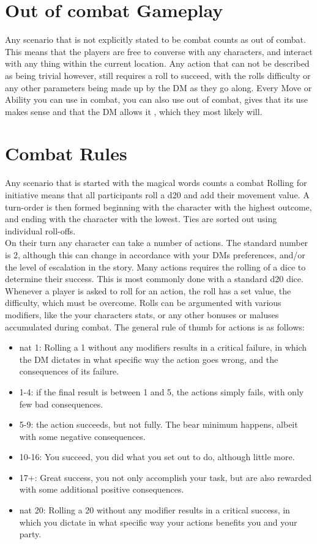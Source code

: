 \documentclass[a4paper,12pt]{article}
\begin{document}
\section{Out of combat Gameplay} 
Any scenario that is not explicitly stated to be combat counts as out of combat. This means that the players are free to converse with any characters, and interact with any thing within the current location. Any action that can not be described as being trivial however, still requires a roll to succeed, with the rolls difficulty or any other parameters being made up by the DM as they go along. Every Move or Ability you can use in combat, you can also use out of combat, gives that its use makes sense and that the DM allows it , which they most likely will.

\section{Combat Rules}
Any scenario that is started with the magical words  counts a combat Rolling for initiative means that all participants roll a d20 and add their movement value. A turn-order is then formed beginning with the character with the highest outcome, and ending with the character with the lowest. Ties are sorted out using individual roll-offs.\\
On their turn any character can take a number of actions. The standard number is 2, although this can change in accordance with your DMs preferences, and/or the level of escalation in the story. Many actions requires the rolling of a dice to determine their success. This is most commonly done with a standard d20 dice. Whenever a player is asked to roll for an action, the roll has a set value, the difficulty, which must be overcome. Rolls can be argumented with various modifiers, like the your characters stats, or any other bonuses or maluses accumulated during combat. The general rule of thumb for  actions is as follows:
\begin{itemize}
	\item nat 1: Rolling a 1 without any modifiers results in a critical failure, in which the DM dictates in what specific way the action goes wrong, and the consequences of its failure.
	\item 1-4: if the final result is between 1 and 5, the actions simply fails, with only few bad consequences.
	\item 5-9: the action succeeds, but not fully. The bear minimum happens, albeit with some negative consequences.
	\item 10-16: You succeed, you did what you set out to do, although little more.
	\item 17+: Great success, you not only accomplish your task, but are also rewarded with some additional positive consequences.
	\item nat 20: Rolling a 20 without any modifier results in a critical success, in which you dictate in what specific way your actions benefits you and your party.
\end{itemize}
\end{document}
